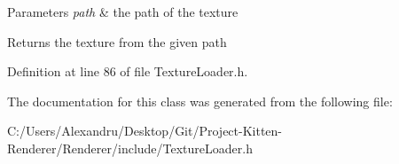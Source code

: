 \begin{DoxyParams}{Parameters}
{\em path} & the path of the texture \\
\hline
\end{DoxyParams}
\begin{DoxyReturn}{Returns}
the texture from the given path 
\end{DoxyReturn}


Definition at line 86 of file Texture\+Loader.\+h.



The documentation for this class was generated from the following file\+:\begin{DoxyCompactItemize}
\item 
C\+:/\+Users/\+Alexandru/\+Desktop/\+Git/\+Project-\/\+Kitten-\/\+Renderer/\+Renderer/include/Texture\+Loader.\+h\end{DoxyCompactItemize}
